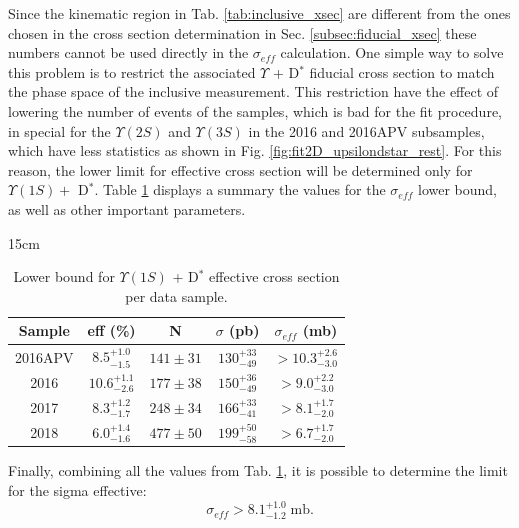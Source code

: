 Since the kinematic region in Tab. \ref{tab:inclusive_xsec} are different from the ones chosen in the cross section determination in Sec. \ref{subsec:fiducial_xsec} these numbers cannot be used directly in the $\sigma_{eff}$ calculation. One simple way to solve this problem is to restrict the associated $\Upsilon$ + D$^*$ fiducial cross section to match the phase space of the inclusive measurement. This restriction have the effect of lowering the number of events of the samples, which is bad for the fit procedure, in special for the $\Upsilon(2S)$ and $\Upsilon(3S)$ in the 2016 and 2016APV subsamples, which have less statistics as shown in Fig. \ref{fig:fit2D_upsilondstar_rest}. For this reason, the lower limit for effective cross section will be determined only for $\Upsilon(1S) +$ D$^*$. Table \ref{tab:xsec_eff} displays a summary the values for the $\sigma_{eff}$ lower bound, as well as other important parameters.

\begin{table}[!htbp]{15cm}
  \caption{Lower bound for $\Upsilon(1S)$ + D$^{*}$ effective cross section per data sample.}
  \begin{tabular}{ c | c | c | c | c }
    \hline
    Sample & eff (\%) & N & $\sigma$ (pb) & $\sigma_{eff}$ (mb) \\ \hline
    2016APV & $8.5^{+1.0}_{-1.5}$ & $141 \pm 31$ & $130^{+33}_{-49}$ & $>10.3^{+2.6}_{-3.0}$ \\ \hline 
    2016    & $10.6^{+1.1}_{-2.6}$ & $177 \pm 38$ & $150^{+36}_{-49}$ & $>9.0^{+2.2}_{-3.0}$ \\ \hline 
    2017    & $8.3^{+1.2}_{-1.7}$ & $248 \pm 34$ & $166^{+33}_{-41}$ & $>8.1^{+1.7}_{-2.0}$ \\ \hline 
    2018    & $6.0^{+1.4}_{-1.6}$ & $477 \pm 50$ & $199^{+50}_{-58}$ & $>6.7^{+1.7}_{-2.0}$ \\ \hline
  \end{tabular}
  \label{tab:xsec_eff}
\end{table}

Finally, combining all the values from Tab. \ref{tab:xsec_eff}, it is possible to determine the limit for the sigma effective:
\begin{equation}
  \sigma_{eff} > 8.1^{+1.0}_{-1.2} \; \text{mb}.
\end{equation}


